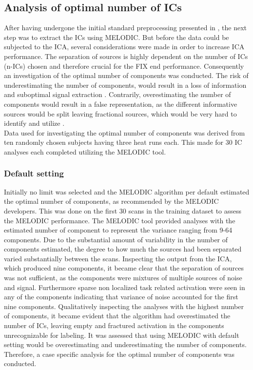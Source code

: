
\subsection{Analysis of optimal number of ICs} \label{sec:optimal}

After having undergone the initial standard preprocessing presented in , the next step was to extract the ICs using MELODIC. But before the data could be subjected to the ICA, several considerations were made in order to increase ICA performance. The separation of sources is highly dependent on the number of ICs (n-ICs) chosen and therefore crucial for the FIX end performance. Consequently an investigation of the optimal number of components was conducted. The risk of underestimating the number of components, would result in a loss of information and suboptimal signal extraction \cite{Beckmann2004}. Contrarily, overestimating the number of components would result in a false representation, as the different informative sources would be split leaving fractional sources, which would be very hard to identify and utilize \cite{Beckmann2004,Li2007}. \\
Data used for investigating the optimal number of components was derived from ten randomly chosen subjects having three heat runs each. This made for 30 IC analyses each completed utilizing the MELODIC tool. 


\subsubsection{Default setting}
Initially no limit was selected and the MELODIC algorithm per default estimated the optimal number of components, as recommended by the MELODIC developers. \cite{FMRIB2016} This was done on the first 30 scans in the training dataset to assess the MELODIC performance. The MELODIC tool provided analyses with the estimated number of component to represent the variance ranging from 9-64 components. Due to the substantial amount of variability in the number of components estimated, the degree to how much the sources had been separated varied substantially between the scans. Inspecting the output from the ICA, which produced nine components, it became clear that the separation of sources was not sufficient, as the components were mixtures of multiple sources of noise and signal. Furthermore sparse non localized task related activation were seen in any of the components indicating that variance of noise accounted for the first nine components. Qualitatively inspecting the analyses with the highest number of components, it became evident that the algorithm had overestimated the number of ICs, leaving empty and fractured activation in the components unrecognizable for labeling. It was assessed that using MELODIC with default setting would be overestimating and underestimating the number of components. Therefore, a case specific analysis for the optimal number of components was conducted. 

